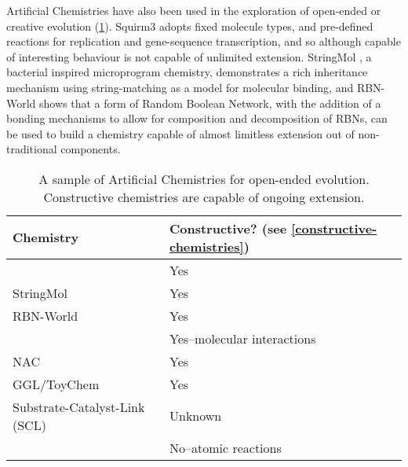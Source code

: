 Artificial Chemistries have also been used in the exploration of open-ended or creative evolution (\eg \cref{tab1}). Squirm3 \parencite{Hutton2002,Hutton2009} adopts fixed molecule types, and pre-defined reactions for replication and gene-sequence transcription, and so although capable of interesting behaviour is not capable of unlimited extension. StringMol \parencite{Hickinbotham2011}, a bacterial inspired microprogram chemistry, demonstrates a rich inheritance mechanism using string-matching as a model for molecular binding, and RBN-World \parencite{Faulconbridge2011} shows that a form of Random Boolean Network, with the addition of a bonding mechanisms to allow for composition and decomposition of RBNs, can be used to build a chemistry capable of almost limitless extension out of non-traditional components.

\begin{table}
	\scriptsize
	\begin{center}
	\caption{A sample of Artificial Chemistries for open-ended evolution. Constructive chemistries are capable of ongoing extension.}
	\label{tab1}
	\begin{tabular}{@{}p{7.5cm}p{6cm}@{}}
		\toprule
		Chemistry                                                          & Constructive? (see \cref{constructive-chemistries})\\ 
		\midrule
		\textcite{Ducharme2012}                                                & Yes                                      \\
		StringMol \parencite{Hickinbotham2012}                             & Yes                                      \\
		RBN-World \parencite{Faulconbridge2011}                            & Yes                                      \\
		\textcite{Lenaerts2009}                                                & Yes--molecular interactions             \\
		NAC \parencite{Suzuki2006}                                         & Yes                                      \\						
		GGL/ToyChem \parencite{Benko2005}                                  & Yes                                      \\
		\midrule
		Substrate-Catalyst-Link (SCL) \parencite{Varela:1974qd,Suzuki2008} & Unknown                                  \\
		\textcite{Fernando:2008xy,Fernando:2007pf}                             & No--atomic reactions                    \\

\end{tabular}
\end{center}
\end{table}
